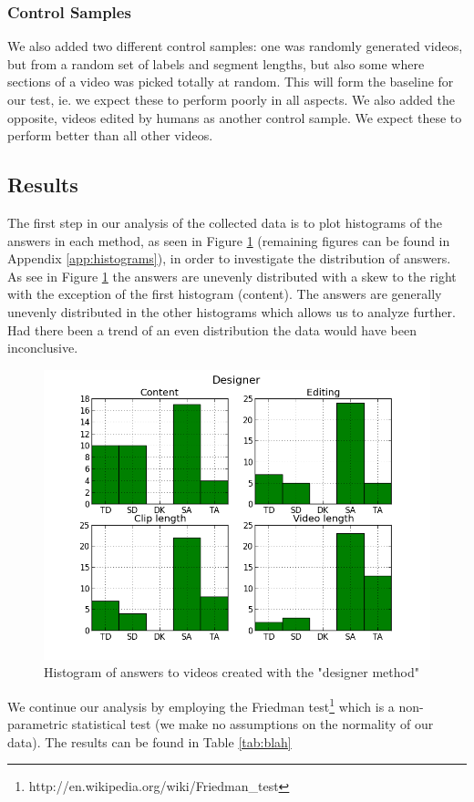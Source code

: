 \subsubsection{Control Samples}
%
We also added two different control samples: one was randomly generated videos, but from a random set of labels and segment lengths, but also some where sections of a video was picked totally at random.
%
%
This will form the baseline for our test, ie. we expect these to perform poorly in all aspects. We also added the opposite, videos edited by humans as another control sample. We expect these to perform better than all other videos.
%
\subsection{Results}
%
The first step in our analysis of the collected data is to plot histograms of the answers in each method, as seen in Figure \ref{fig:hist_design} (remaining figures can be found in Appendix \ref{app:histograms}), in order to investigate the distribution of answers. As see in Figure \ref{fig:hist_design} the answers are unevenly distributed with a skew to the right with the exception of the first histogram (content). The answers are generally unevenly distributed in the other histograms which allows us to analyze further. Had there been a trend of an even distribution the data would have been inconclusive.
%
\begin{figure}
     \centering
     \includegraphics[width=1.0\textwidth]{img/designer_barplot.png}
     \caption{Histogram of answers to videos created with the "designer method"}\label{fig:hist_design}
\end{figure}
%
We continue our analysis by employing the Friedman test\footnote{http://en.wikipedia.org/wiki/Friedman\_test} which is a non-parametric statistical test (we make no assumptions on the normality of our data). The results can be found in Table \ref{tab:blah}
%



%
